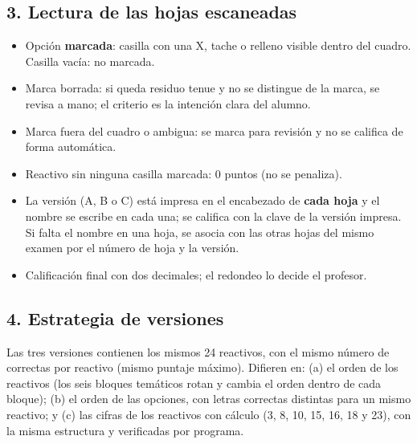 \documentclass[10pt,letterpaper]{article}
\begin{document}
\subsection*{3. Lectura de las hojas escaneadas}
\begin{itemize}[leftmargin=1.2em,itemsep=1pt,topsep=1pt]
\item Opción \textbf{marcada}: casilla con una X, tache o relleno visible dentro del cuadro. Casilla vacía: no marcada.
\item Marca borrada: si queda residuo tenue y no se distingue de la marca, se revisa a mano; el criterio es la intención clara del alumno.
\item Marca fuera del cuadro o ambigua: se marca para revisión y no se califica de forma automática.
\item Reactivo sin ninguna casilla marcada: 0 puntos (no se penaliza).
\item La versión (A, B o C) está impresa en el encabezado de \textbf{cada hoja} y el nombre se escribe en cada una; se califica con la clave de la versión impresa. Si falta el nombre en una hoja, se asocia con las otras hojas del mismo examen por el número de hoja y la versión.
\item Calificación final con dos decimales; el redondeo lo decide el profesor.
\end{itemize}
\subsection*{4. Estrategia de versiones}
Las tres versiones contienen los mismos 24 reactivos, con el mismo número de correctas por reactivo (mismo puntaje máximo). Difieren en: (a) el orden de los reactivos (los seis bloques temáticos rotan y cambia el orden dentro de cada bloque); (b) el orden de las opciones, con letras correctas distintas para un mismo reactivo; y (c) las cifras de los reactivos con cálculo (3, 8, 10, 15, 16, 18 y 23), con la misma estructura y verificadas por programa.
\end{document}
